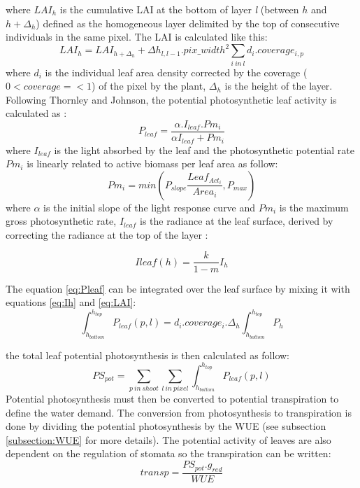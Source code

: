 \documentclass[a4paper,twoside, justified,marginals=raggedright]{tufte-handout}
\begin{document}
where $LAI_{h}$ is the cumulative LAI at the bottom of layer \textit{l} (between $h$ and $h+\Delta_{h}$) defined as the homogeneous layer delimited by the top of consecutive individuals in the same pixel. The LAI is calculated like this:
\begin{equation}\label{eq:LAI}
LAI_{h} = LAI_{h+\Delta_{h}} +  \Delta h_{l, l-1} . pix\_width^{2} \sum_{i\ in\ l}d_{i}.coverage_{i, p}
\end{equation}
where $d_{i}$ is the individual leaf area density corrected by the coverage ($0< coverage =< 1$) of the pixel by the plant, $\Delta_{h}$ is the height of the layer.\\
Following Thornley and Johnson, the potential photosynthetic leaf activity is calculated as :
\begin{equation}\label{eq:Pleaf}
P_{leaf} = \frac{\alpha. I_{leaf}.Pm_{i}}{\alpha I_{leaf}+Pm_{i}}
\end{equation}
 where $I_{leaf}$ is the light absorbed by the leaf and the photosynthetic potential rate $Pm_{i}$ is linearly related to active biomass per leaf area as follow:
\begin{equation}
Pm_{i} = min(P_{slope} \frac{Leaf_{Act_{i}}}{Area_{i}}, P_{max})
\end{equation}
where $\alpha$ is the initial slope of the light response curve and $Pm_{i}$ is the maximum gross photosynthetic rate, $I_{leaf}$ is the radiance at the leaf surface, derived by correcting the radiance at the top of the layer :

\begin{equation}
I{leaf}(h) = \frac{k}{1-m}I_{h}
\end{equation}

The equation \eqref{eq:Pleaf} can be integrated over the leaf surface by mixing it with equations \eqref{eq:Ih} and \eqref{eq:LAI}:
\begin{equation}\label{Ppixlay}
\int_{h_{bottom}}^{h_{top}}P_{leaf}(p,l) = d_{i}.coverage_{i}.\Delta_{h}\int_{h_{bottom}}^{h_{top}}P_{h}
\end{equation}
%

the total leaf potential photosynthesis is then calculated as follow:
\begin{equation}\label{eq:PS_pot}
PS_{pot} = \sum_{p\ in\ shoot}\sum_{l\ in\ pixel}\int_{h_{bottom}}^{h_{top}}P_{leaf}(p,l)
\end{equation}
\indent Potential photosynthesis must then be converted to potential transpiration to define the water demand. The conversion from photosynthesis to transpiration is done by dividing the potential photosynthesis by the WUE (see subsection \ref{subsection:WUE} for more details). The potential activity of leaves are also dependent on the regulation of stomata so the transpiration can be written:
\begin{equation}
transp = \frac{PS_{pot} . g_{red}}{WUE}
\end{equation}
\end{document}
